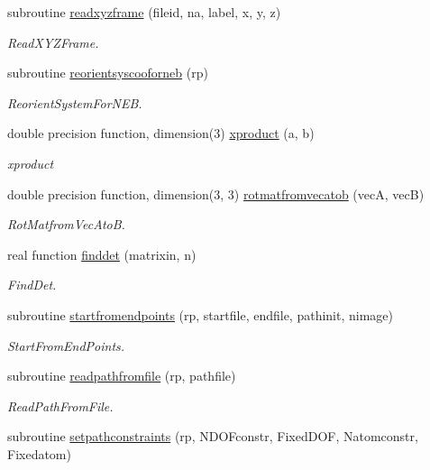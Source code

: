 \begin{DoxyCompactItemize}
subroutine \mbox{\hyperlink{namespacerpath_aba836ec30e7b0733327d8f2949e4b00c}{readxyzframe}} (fileid, na, label, x, y, z)
\begin{DoxyCompactList}\small\item\em Read\+X\+Y\+Z\+Frame. \end{DoxyCompactList}\item 
subroutine \mbox{\hyperlink{namespacerpath_a9c5a494d479b12f65ad8913faf4f4028}{reorientsyscooforneb}} (rp)
\begin{DoxyCompactList}\small\item\em Reorient\+System\+For\+N\+EB. \end{DoxyCompactList}\item 
double precision function, dimension(3) \mbox{\hyperlink{namespacerpath_a5d207ca62bfc4e1fa21f80f112ebaa08}{xproduct}} (a, b)
\begin{DoxyCompactList}\small\item\em xproduct \end{DoxyCompactList}\item 
double precision function, dimension(3, 3) \mbox{\hyperlink{namespacerpath_a12b369bd567aeaa3c22e2d2edccf1061}{rotmatfromvecatob}} (vecA, vecB)
\begin{DoxyCompactList}\small\item\em Rot\+Matfrom\+Vec\+AtoB. \end{DoxyCompactList}\item 
real function \mbox{\hyperlink{namespacerpath_a9e31b64b8c7ca2095afd9fc69f8e944b}{finddet}} (matrixin, n)
\begin{DoxyCompactList}\small\item\em Find\+Det. \end{DoxyCompactList}\item 
subroutine \mbox{\hyperlink{namespacerpath_abde80fc3058f25748933e535857b3913}{startfromendpoints}} (rp, startfile, endfile, pathinit, nimage)
\begin{DoxyCompactList}\small\item\em Start\+From\+End\+Points. \end{DoxyCompactList}\item 
subroutine \mbox{\hyperlink{namespacerpath_a06918a9ef3a6a733a078f2d7142ca2e3}{readpathfromfile}} (rp, pathfile)
\begin{DoxyCompactList}\small\item\em Read\+Path\+From\+File. \end{DoxyCompactList}\item 
subroutine \mbox{\hyperlink{namespacerpath_afeb43b9e8aed2543261318d3585a0832}{setpathconstraints}} (rp, N\+D\+O\+Fconstr, Fixed\+D\+OF, Natomconstr, Fixedatom)

\end{DoxyCompactItemize}
